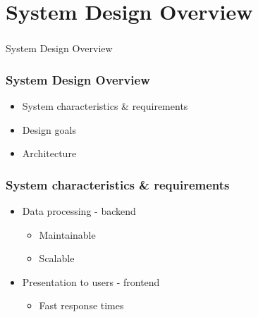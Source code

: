 \section[System Design Overview]{System Design Overview}

\begin{frame}
  \frametitle{}
  \begin{center}
    {\Huge System Design Overview}
  \end{center}
\end{frame}

\begin{frame}
    \frametitle{System Design Overview}
    \centering
    \begin{itemize}
      \item System characteristics \& requirements
      \item Design goals
      \item Architecture
    \end{itemize}
\end{frame}

\begin{frame}
    \frametitle{System characteristics \& requirements}
    \centering
    \begin{itemize}
      \item Data processing - backend
      \begin{itemize}
        \item Maintainable
        \item Scalable
      \end{itemize}
      \item Presentation to users - frontend
      \begin{itemize}
        \item Fast response times
      \end{itemize}
    \end{itemize}
\end{frame}

